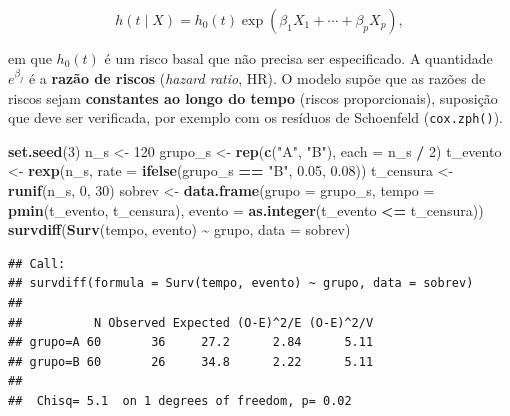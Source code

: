 \documentclass[
]{book}
\newenvironment{Shaded}{\begin{snugshade}}{\end{snugshade}}
\newcommand{\AttributeTok}[1]{\textcolor[rgb]{0.13,0.29,0.53}{#1}}
\newcommand{\DecValTok}[1]{\textcolor[rgb]{0.00,0.00,0.81}{#1}}
\newcommand{\FloatTok}[1]{\textcolor[rgb]{0.00,0.00,0.81}{#1}}
\newcommand{\FunctionTok}[1]{\textcolor[rgb]{0.13,0.29,0.53}{\textbf{#1}}}
\newcommand{\NormalTok}[1]{#1}
\newcommand{\OtherTok}[1]{\textcolor[rgb]{0.56,0.35,0.01}{#1}}
\newcommand{\SpecialCharTok}[1]{\textcolor[rgb]{0.81,0.36,0.00}{\textbf{#1}}}
\newcommand{\StringTok}[1]{\textcolor[rgb]{0.31,0.60,0.02}{#1}}
\begin{document}
\[
h(t \mid X) = h_0(t)\exp(\beta_1 X_1 + \cdots + \beta_p X_p),
\]

em que \(h_0(t)\) é um risco basal que não precisa ser especificado. A quantidade \(e^{\beta_j}\) é a \textbf{razão de riscos} (\emph{hazard ratio}, HR). O modelo supõe que as razões de riscos sejam \textbf{constantes ao longo do tempo} (riscos proporcionais), suposição que deve ser verificada, por exemplo com os resíduos de Schoenfeld (\texttt{cox.zph()}).

\begin{Shaded}
\begin{Highlighting}[]
\FunctionTok{set.seed}\NormalTok{(}\DecValTok{3}\NormalTok{)}
\NormalTok{n\_s }\OtherTok{\textless{}{-}} \DecValTok{120}
\NormalTok{grupo\_s }\OtherTok{\textless{}{-}} \FunctionTok{rep}\NormalTok{(}\FunctionTok{c}\NormalTok{(}\StringTok{"A"}\NormalTok{, }\StringTok{"B"}\NormalTok{), }\AttributeTok{each =}\NormalTok{ n\_s }\SpecialCharTok{/} \DecValTok{2}\NormalTok{)}
\NormalTok{t\_evento }\OtherTok{\textless{}{-}} \FunctionTok{rexp}\NormalTok{(n\_s, }\AttributeTok{rate =} \FunctionTok{ifelse}\NormalTok{(grupo\_s }\SpecialCharTok{==} \StringTok{"B"}\NormalTok{, }\FloatTok{0.05}\NormalTok{, }\FloatTok{0.08}\NormalTok{))}
\NormalTok{t\_censura }\OtherTok{\textless{}{-}} \FunctionTok{runif}\NormalTok{(n\_s, }\DecValTok{0}\NormalTok{, }\DecValTok{30}\NormalTok{)}
\NormalTok{sobrev }\OtherTok{\textless{}{-}} \FunctionTok{data.frame}\NormalTok{(}\AttributeTok{grupo =}\NormalTok{ grupo\_s, }\AttributeTok{tempo =} \FunctionTok{pmin}\NormalTok{(t\_evento, t\_censura),}
                     \AttributeTok{evento =} \FunctionTok{as.integer}\NormalTok{(t\_evento }\SpecialCharTok{\textless{}=}\NormalTok{ t\_censura))}
\FunctionTok{survdiff}\NormalTok{(}\FunctionTok{Surv}\NormalTok{(tempo, evento) }\SpecialCharTok{\textasciitilde{}}\NormalTok{ grupo, }\AttributeTok{data =}\NormalTok{ sobrev)}
\end{Highlighting}
\end{Shaded}

\begin{verbatim}
## Call:
## survdiff(formula = Surv(tempo, evento) ~ grupo, data = sobrev)
## 
##          N Observed Expected (O-E)^2/E (O-E)^2/V
## grupo=A 60       36     27.2      2.84      5.11
## grupo=B 60       26     34.8      2.22      5.11
## 
##  Chisq= 5.1  on 1 degrees of freedom, p= 0.02
\end{verbatim}

\begin{Shaded}
\end{Shaded}
\end{document}
